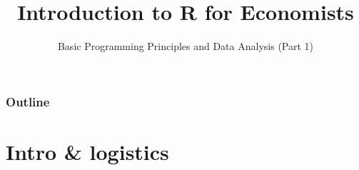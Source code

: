 \documentclass{beamer}
\title{Introduction to R for Economists}
\subtitle[Part 1]
	{Basic Programming Principles and Data Analysis (Part 1)
	}
\begin{document}
\begin{frame}
  \titlepage
\end{frame}


\begin{frame}
 \frametitle{Outline}
 \tableofcontents%
\end{frame}


















\section{Intro \& logistics}
\end{document}
